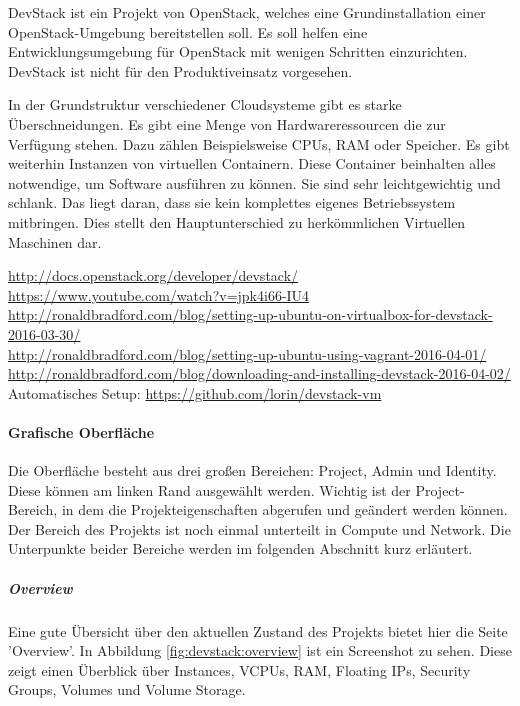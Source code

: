 \documentclass[a4paper,10pt]{article}
\numberwithin{figure}{section}
\numberwithin{table}{section}
\begin{document}
DevStack ist ein Projekt von OpenStack, welches eine Grundinstallation einer OpenStack-Umgebung bereitstellen soll.
Es soll helfen eine Entwicklungsumgebung für OpenStack mit wenigen Schritten einzurichten.
DevStack ist nicht für den Produktiveinsatz vorgesehen.

In der Grundstruktur verschiedener Cloudsysteme gibt es starke Überschneidungen.
Es gibt eine Menge von Hardwareressourcen die zur Verfügung stehen.
Dazu zählen Beispielsweise CPUs, RAM oder Speicher.
Es gibt weiterhin Instanzen von virtuellen Containern.
Diese Container beinhalten alles notwendige, um Software ausführen zu können.
Sie sind sehr leichtgewichtig und schlank.
Das liegt daran, dass sie kein komplettes eigenes Betriebssystem mitbringen.
Dies stellt den Hauptunterschied zu herkömmlichen Virtuellen Maschinen dar.

\url{http://docs.openstack.org/developer/devstack/}\\
\url{https://www.youtube.com/watch?v=jpk4i66-IU4}\\
\url{http://ronaldbradford.com/blog/setting-up-ubuntu-on-virtualbox-for-devstack-2016-03-30/}\\
\url{http://ronaldbradford.com/blog/setting-up-ubuntu-using-vagrant-2016-04-01/}\\
\url{http://ronaldbradford.com/blog/downloading-and-installing-devstack-2016-04-02/}\\

Automatisches Setup: \url{https://github.com/lorin/devstack-vm}

\paragraph{Grafische Oberfläche}

Die Oberfläche besteht aus drei großen Bereichen: Project, Admin und Identity.
Diese können am linken Rand ausgewählt werden.
Wichtig ist der Project-Bereich, in dem die Projekteigenschaften abgerufen und geändert werden können.
Der Bereich des Projekts ist noch einmal unterteilt in Compute und Network.
Die Unterpunkte beider Bereiche werden im folgenden Abschnitt kurz erläutert.

\subparagraph{Overview}

Eine gute Übersicht über den aktuellen Zustand des Projekts bietet hier die Seite 'Overview'.
In Abbildung \ref{fig:devstack:overview} ist ein Screenshot zu sehen.
Diese zeigt einen Überblick über Instances, VCPUs, RAM, Floating IPs, Security Groups, Volumes und Volume Storage.
\end{document}
